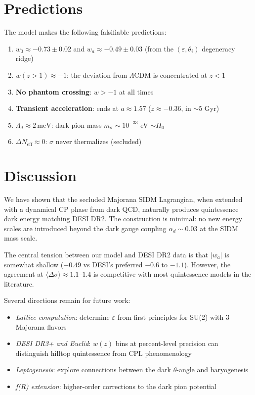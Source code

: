 \documentclass[11pt,a4paper]{article}
\newcommand{\Ld}{\Lambda_d}
\newcommand{\meV}{\,\mathrm{meV}}
\begin{document}
\section{Predictions}
\label{sec:predictions}

The model makes the following falsifiable predictions:
\begin{enumerate}
  \item \textbf{$w_0 \approx -0.73 \pm 0.02$} and \textbf{$w_a \approx -0.49 \pm 0.03$} 
    (from the $(\varepsilon, \theta_i)$ degeneracy ridge)
  \item \textbf{$w(z > 1) \approx -1$}: the deviation from $\Lambda$CDM is concentrated at $z < 1$
  \item \textbf{No phantom crossing}: $w > -1$ at all times
  \item \textbf{Transient acceleration}: ends at $a \approx 1.57$ ($z \approx -0.36$, in $\sim5$ Gyr)
  \item \textbf{$\Ld \approx 2\meV$}: dark pion mass $m_\sigma \sim 10^{-33}$ eV $\sim H_0$
  \item \textbf{$\Delta N_\mathrm{eff} \approx 0$}: $\sigma$ never thermalizes (secluded)
\end{enumerate}

\section{Discussion}
\label{sec:discussion}

We have shown that the secluded Majorana SIDM Lagrangian, when extended with a dynamical 
CP phase from dark QCD, naturally produces quintessence dark energy matching DESI DR2.
The construction is minimal: no new energy scales are introduced beyond the dark gauge 
coupling $\alpha_d \sim 0.03$ at the SIDM mass scale.

The central tension between our model and DESI DR2 data is that $|w_a|$ is somewhat shallow 
($-0.49$ vs DESI's preferred $-0.6$ to $-1.1$). However, the agreement at 
$\langle\Delta\sigma\rangle \approx 1.1$--$1.4$ is competitive with most quintessence models
in the literature.

Several directions remain for future work:
\begin{itemize}
  \item \emph{Lattice computation}: determine $\varepsilon$ from first principles for SU(2) with 3 Majorana flavors
  \item \emph{DESI DR3+ and Euclid}: $w(z)$ bins at percent-level precision can distinguish 
    hilltop quintessence from CPL phenomenology
  \item \emph{Leptogenesis}: explore connections between the dark $\theta$-angle and baryogenesis
  \item \emph{f(R) extension}: higher-order corrections to the dark pion potential
\end{itemize}
\end{document}
